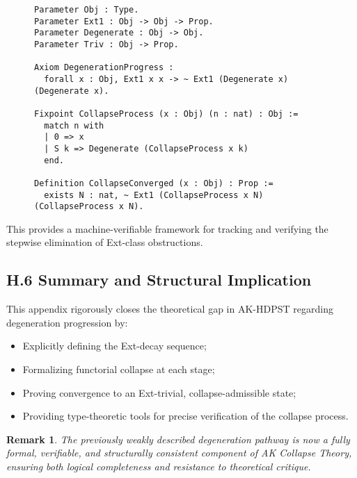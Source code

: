 \documentclass[11pt]{article}
\newtheorem{remark}[theorem]{Remark}
\begin{document}
\begin{figure}[h]
\centering
\begin{lstlisting}[language=Coq, caption=Formal Collapse Process Encoding]
Parameter Obj : Type.
Parameter Ext1 : Obj -> Obj -> Prop.
Parameter Degenerate : Obj -> Obj.
Parameter Triv : Obj -> Prop.

Axiom DegenerationProgress :
  forall x : Obj, Ext1 x x -> ~ Ext1 (Degenerate x) (Degenerate x).

Fixpoint CollapseProcess (x : Obj) (n : nat) : Obj :=
  match n with
  | 0 => x
  | S k => Degenerate (CollapseProcess x k)
  end.

Definition CollapseConverged (x : Obj) : Prop :=
  exists N : nat, ~ Ext1 (CollapseProcess x N) (CollapseProcess x N).
\end{lstlisting}
\end{figure}

This provides a machine-verifiable framework for tracking and verifying the stepwise elimination of Ext-class obstructions.

\subsection*{H.6 Summary and Structural Implication}

This appendix rigorously closes the theoretical gap in AK-HDPST regarding degeneration progression by:

\begin{itemize}
    \item Explicitly defining the Ext-decay sequence;
    \item Formalizing functorial collapse at each stage;
    \item Proving convergence to an Ext-trivial, collapse-admissible state;
    \item Providing type-theoretic tools for precise verification of the collapse process.
\end{itemize}

\begin{remark}
The previously weakly described degeneration pathway is now a fully formal, verifiable, and structurally consistent component of AK Collapse Theory, ensuring both logical completeness and resistance to theoretical critique.
\end{remark}



\end{document}
